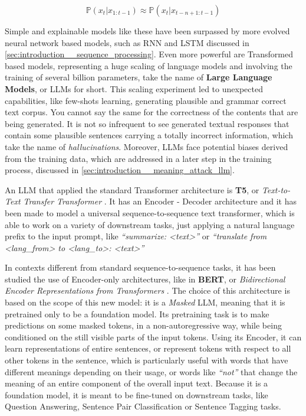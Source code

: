 \documentclass[../thesis.tex]{subfiles}
\begin{document}
\begin{equation}
    \mathbb{P}(x_t | x_{1:t-1}) \approx \mathbb{P}(x_t | x_{t-n+1:t-1})
\end{equation}

Simple and explainable models like these have been surpassed by more evolved neural network based models, such as RNN and LSTM discussed in \cref{sec:introduction__sequence_processing}.
Even more powerful are Transformed based models, representing a huge scaling of language models and involving the training of several billion parameters, take the name of \textbf{Large Language Models}, or LLMs for short. This scaling experiment led to unexpected capabilities, like few-shots learning, generating plausible and grammar correct text corpus.
You cannot say the same for the correctness of the contents that are being generated. It is not so infrequent to see generated textual responses that contain some plausible sentences carrying a totally incorrect information, which take the name of \emph{hallucinations}.
Moreover, LLMs face potential biases derived from the training data, which are addressed in a later step in the training process, discussed in \cref{sec:introduction__meaning_attack_llm}.

An LLM that applied the standard Transformer architecture is \textbf{T5}, or \emph{Text-to-Text Transfer Transformer}
\citep{raffel2020exploringt5}. It has an Encoder - Decoder architecture and it has been made to model a universal sequence-to-sequence text transformer, which is able to work on a variety of downstream tasks, just applying a natural language prefix to the input prompt, like \emph{``summarize: <text>''} or \emph{``translate from <lang\_from> to <lang\_to>: <text>''}

In contexts different from standard sequence-to-sequence tasks, it has been studied the use of Encoder-only architectures, like in \textbf{BERT}, or \emph{Bidirectional Encoder Representations from Transformers} \cite{devlin2019bert}.
The choice of this architecture is based on the scope of this new model: it is a \emph{Masked} LLM, meaning that it is pretrained only to be a foundation model.
Its pretraining task is to make predictions on some masked tokens, in a non-autoregressive way, while being conditioned on the still visible parts of the input tokens.
Using its Encoder, it can learn representations of entire sentences, or represent tokens with respect to all other tokens in the sentence, which is particularly useful with words that have different meanings depending on their usage, or words like \emph{``not''} that change the meaning of an entire component of the overall input text.
Because it is a foundation model, it is meant to be fine-tuned on downstream tasks, like Question Answering, Sentence Pair Classification or Sentence Tagging tasks.
\end{document}

